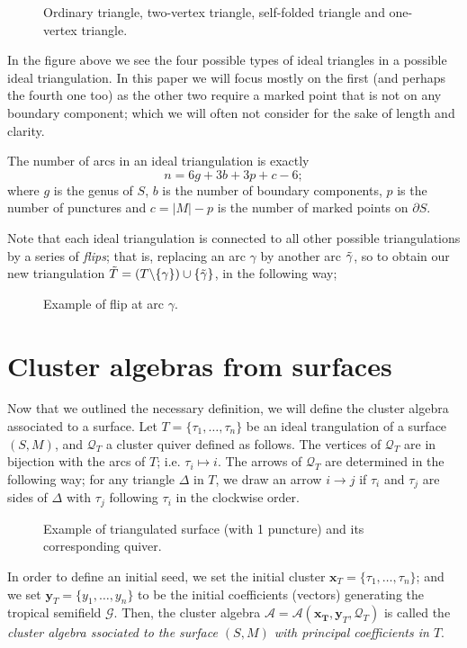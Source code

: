 \begin{figure}[H]
    \centering
    
    \caption{Ordinary triangle, two-vertex triangle, self-folded triangle and one-vertex triangle.}
\end{figure}
In the figure above we see the four possible types of ideal triangles in a possible ideal triangulation. In this paper we will focus mostly on the first (and perhaps the fourth one too) as the other two require a marked point that is not on any boundary component; which we will often not consider for the sake of length and clarity. 
\begin{theorem}{\normalfont \cite{Sch}}
The number of arcs in an ideal triangulation is exactly
\begin{equation*}
    n = 6g + 3b + 3p + c - 6;
\end{equation*}
where $g$ is the genus of $S$, $b$ is the number of boundary components, $p$ is the number of punctures and $c = |M|-p$ is the number of marked points on $\partial S$.
\end{theorem}
\begin{remark}
Note that each ideal triangulation is connected to all other possible triangulations by a series of \emph{flips}; that is, replacing an arc $\gamma$ by another arc $\Tilde{\gamma}$, so to obtain our new triangulation $\Tilde{T} = (T\backslash\{\gamma\}) \cup \{\Tilde{\gamma}\}$, in the following way; 
\begin{figure}[H]
    \centering
    
    \caption{Example of flip at arc $\gamma$.}
\end{figure}
\end{remark}


\section{Cluster algebras from surfaces}
Now that we outlined the necessary definition, we will define the cluster algebra associated to a surface.
Let $T = \{\tau_1, \dots, \tau_n\}$ be an ideal trangulation of a surface $(S,M)$, and $\mathcal{Q}_T$ a cluster quiver defined as follows.
The vertices of $\mathcal{Q}_T$ are in bijection with the arcs of $T$; i.e. $\tau_i \mapsto i$. The arrows of $\mathcal{Q}_T$ are determined in the following way; for any triangle $\Delta$ in $T$, we draw an arrow $i \to j$ if $\tau_i$ and $\tau_j$ are sides of $\Delta$ with $\tau_j$ following $\tau_i$ in the clockwise order.
\begin{figure}[H]
    \centering
    
    \caption{Example of triangulated surface (with 1 puncture) and its corresponding quiver.}
\end{figure}
In order to define an initial seed, we set the initial cluster $\mathbf{x}_T = \{\tau_1,\dots,\tau_n\}$; and we set $\mathbf{y}_T = \{y_1,\dots,y_n\}$ to be the initial coefficients (vectors) generating the tropical semifield $\mathcal{G}$.
Then, the cluster algebra $\mathcal{A} = \mathcal{A}(\mathbf{x_T},\mathbf{y}_T,\mathcal{Q}_T)$ is called the \emph{cluster algebra ssociated to the surface $(S,M)$ with principal coefficients in $T$}.

